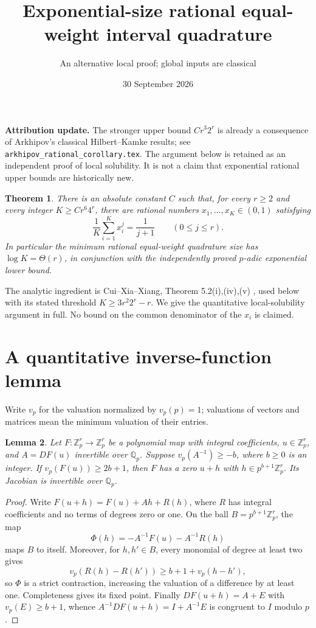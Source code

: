 \documentclass[11pt]{article}
\title{Exponential-size rational equal-weight interval quadrature}
\author{An alternative local proof; global inputs are classical}
\date{30 September 2026}
\newtheorem{theorem}{Theorem}
\newtheorem{lemma}[theorem]{Lemma}
\newcommand{\Q}{\mathbb Q}
\newcommand{\Z}{\mathbb Z}
\begin{document}
\maketitle

\noindent\textbf{Attribution update.} The stronger upper bound
$Cr^3 2^r$ is already a consequence of Arkhipov's classical
Hilbert--Kamke results; see \texttt{arkhipov\_rational\_corollary.tex}.
The argument below is retained as an independent proof of local
solubility. It is not a claim that exponential rational upper bounds
are historically new.

\begin{theorem}\label{main}
There is an absolute constant $C$ such that, for every $r\ge2$ and every
integer $K\ge C r^6 4^r$, there are rational numbers
$x_1,\ldots,x_K\in(0,1)$ satisfying
\[
 \frac1K\sum_{i=1}^K x_i^j=\frac1{j+1}\qquad(0\le j\le r).
\]
In particular the minimum rational equal-weight quadrature size has
$\log K=\Theta(r)$, in conjunction with the independently proved
$p$-adic exponential lower bound.
\end{theorem}

The analytic ingredient is Cui--Xia--Xiang, Theorem 5.2(i),(iv),(v)
\cite{cxx}, used below with its stated threshold $K\ge3r^2 2^r-r$.
We give the quantitative local-solubility argument in full. No bound on
the common denominator of the $x_i$ is claimed.

\section{A quantitative inverse-function lemma}
Write $v_p$ for the valuation normalized by $v_p(p)=1$; valuations of
vectors and matrices mean the minimum valuation of their entries.

\begin{lemma}\label{hensel}
Let $F:\Z_p^r\to\Z_p^r$ be a polynomial map with integral coefficients,
$u\in\Z_p^r$, and $A=DF(u)$ invertible over $\Q_p$. Suppose
$v_p(A^{-1})\ge-b$, where $b\ge0$ is an integer. If
$v_p(F(u))\ge2b+1$, then $F$ has a zero $u+h$ with
$h\in p^{b+1}\Z_p^r$. Its Jacobian is invertible over $\Q_p$.
\end{lemma}
\begin{proof}
Write $F(u+h)=F(u)+Ah+R(h)$, where $R$ has integral coefficients
and no terms of degrees zero or one. On the ball
$B=p^{b+1}\Z_p^r$, the map
\[
 \Phi(h)=-A^{-1}F(u)-A^{-1}R(h)
\]
maps $B$ to itself. Moreover, for $h,h'\in B$, every monomial of degree
at least two gives
\[
 v_p(R(h)-R(h'))\ge b+1+v_p(h-h'),
\]
so $\Phi$ is a strict contraction, increasing the valuation of a
difference by at least one. Completeness gives its fixed point.
Finally $DF(u+h)=A+E$ with $v_p(E)\ge b+1$, whence
$A^{-1}DF(u+h)=I+A^{-1}E$ is congruent to $I$ modulo $p$.
\end{proof}
\end{document}
